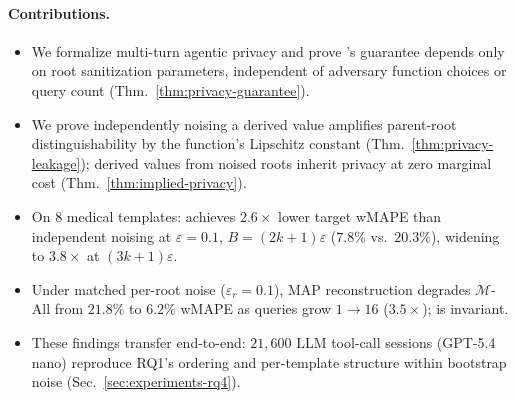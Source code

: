 \paragraph{Contributions.}
\begin{itemize}
    \item We formalize multi-turn agentic privacy and prove \sysname{}'s guarantee depends only on root sanitization parameters, independent of adversary function choices or query count (Thm.~\ref{thm:privacy-guarantee}).
    \item We prove independently noising a derived value amplifies parent-root distinguishability by the function's Lipschitz constant (Thm.~\ref{thm:privacy-leakage}); derived values from noised roots inherit privacy at zero marginal cost (Thm.~\ref{thm:implied-privacy}).
    \item On 8 medical templates: \sysname{} achieves $2.6\times$ lower target wMAPE than independent noising at $\varepsilon = 0.1$, $B = (2k{+}1)\varepsilon$ ($7.8\%$ vs.\ $20.3\%$), widening to $3.8\times$ at $(3k{+}1)\varepsilon$.
    \item Under matched per-root noise ($\varepsilon_r = 0.1$), MAP reconstruction degrades $\mathcal{M}$-All from $21.8\%$ to $6.2\%$ wMAPE as queries grow $1{\to}16$ ($3.5\times$); \sysname{} is invariant.
    \item These findings transfer end-to-end: $21{,}600$ LLM tool-call sessions (GPT-5.4 nano) reproduce RQ1's ordering and per-template structure within bootstrap noise (Sec.~\ref{sec:experiments-rq4}).
\end{itemize}
